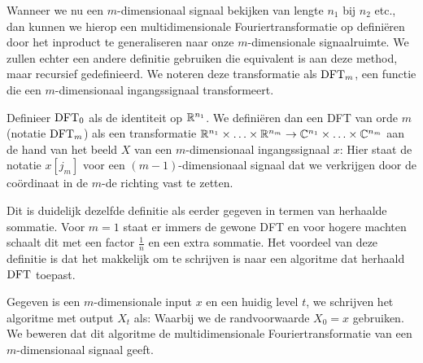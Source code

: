 Wanneer we nu een $m$-dimensionaal signaal bekijken van lengte $n_1$ bij $n_2$ etc., dan kunnen we
hierop een multidimensionale Fouriertransformatie op defini\"eren door het inproduct te generaliseren naar
onze $m$-dimensionale signaalruimte.
We zullen echter een andere definitie gebruiken die equivalent is aan deze method, maar recursief gedefinieerd.
We noteren deze transformatie als $\text{DFT}_m$, een functie die een $m$-dimensionaal ingangssignaal transformeert.
\begin{definitie}
  Definieer $\text{DFT}_0$ als de identiteit op $\mathbb{R}^{n_1}$.
  We defini\"eren dan een DFT van orde $m$ (notatie $\text{DFT}_m$) als een transformatie
  $\mathbb{R}^{n_1}\times\ldots\times\mathbb{R}^{n_m} \to \mathbb{C}^{n_1}\times\ldots\times\mathbb{C}^{n_m}$ aan de hand van het beeld $X$ van een $m$-dimensionaal ingangssignaal $x$:
  Hier staat de notatie $x[j_m]$ voor een $(m-1)$-dimensionaal signaal dat we verkrijgen door de co\"ordinaat
  in de $m$-de richting vast te zetten.
\end{definitie}
Dit is duidelijk dezelfde definitie als eerder gegeven in termen van herhaalde sommatie. Voor $m=1$ staat er immers de gewone DFT en voor hogere machten schaalt dit met een factor $\tfrac{1}{n}$ en een extra sommatie.
Het voordeel van deze definitie is dat het makkelijk om te schrijven is naar een algoritme dat
herhaald $\text{DFT}$ toepast.
\begin{algo}
  Gegeven is een $m$-dimensionale input $x$ en een huidig level $t$,
  we schrijven het algoritme met output $X_t$ als:
  Waarbij we de randvoorwaarde $X_0 = x$ gebruiken. We beweren dat dit algoritme de multidimensionale Fouriertransformatie van een $m$-dimensionaal signaal geeft.
\end{algo}
